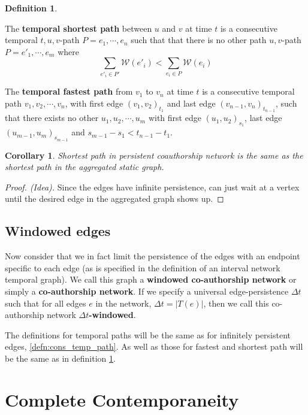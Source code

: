 \documentclass{article}
\newtheorem{cor}[thm]{Corollary}
\theoremstyle{definition}
\newtheorem{defn}[thm]{Definition}
\numberwithin{thm}{subsection}
\newcommand{\W}{\mathcal{W}}
\begin{document}
\begin{defn}

  \label{defn:short_fast_path}

  The \textbf{temporal shortest path} between $u$ and $v$ at time $t$ is a consecutive
  temporal $t,u,v$-path $P = e_1, \cdots, e_n$ such that that there is no other
  path $u,v$-path $P = e'_1, \cdots, e_m$ where
  \[\sum_{e'_i \in P'} \W(e'_i) < \sum_{e_i \in P} \W(e_i) \]

  The \textbf{temporal fastest path} from $v_1$ to $v_n$ at time $t$ is a consecutive
  temporal path $v_1,v_2,\cdots,v_n$, with first edge $(v_1,v_2)_{t_1}$ and last
  edge $(v_{n-1},v_n)_{t_{n-1}}$, such that there exists no other
  $u_1,u_2, \cdots, u_m$ with first edge $(u_1,u_2)_{s_1}$, last edge
  $(u_{m-1},u_m)_{s_{m-1}}$ and $s_{m-1} - s_1 < t_{n-1} - t_{1}$.
\end{defn}


\begin{cor}
  Shortest path in persistent coauthorship network is the same as the shortest
  path in the aggregated static graph.
\end{cor}

\begin{proof}[Proof. (Idea)]
  Since the edges have infinite persistence, can just wait at a vertex until
  the desired edge in the aggregated graph shows up.
\end{proof}


\subsection{Windowed edges}

Now consider that we in fact limit the persistence of the edges with an endpoint
specific to each edge (as is specified in the definition of an interval network
temporal graph). We call this graph a \textbf{windowed co-authorship network} or
simply a \textbf{co-authorship network}. If we specify a universal
edge-persistence $\Delta t$ such that for all edges $e$ in the
network, $\Delta t = |T(e)|$, then we call this co-authorship network
\textbf{$\Delta t$-windowed}.

The definitions for temporal paths will be the same as for infinitely persistent
edges, \ref{defn:cons_temp_path}. As well as those for fastest and shortest path
will be the same as in definition \ref{defn:short_fast_path}.

\section{Complete Contemporaneity}
\end{document}
